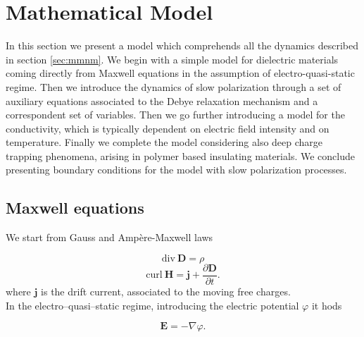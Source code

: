 \documentclass[11pt,a4paper]{article}
\begin{document}
\section{Mathematical Model}\label{sec:mat-model}
In this section we present a model which comprehends all the dynamics described in section \ref{sec:mmnm}. We begin with a simple model for dielectric materials coming directly from Maxwell equations in the assumption of electro-quasi-static regime. Then we introduce the dynamics of slow polarization through a set of auxiliary equations associated to the Debye relaxation mechanism and a correspondent set of variables. Then we go further introducing a model for the conductivity, which is typically dependent on electric field intensity and on temperature. Finally we complete the model considering also deep charge trapping phenomena, arising in polymer based insulating materials. We conclude presenting boundary conditions for the model with slow polarization processes.
\subsection{Maxwell equations}
We start from Gauss and Ampère-Maxwell laws

\begin{equation}
	\mathrm{div}\  \mathbf{D}  = \rho 
	\label{eq:Maxwell1}
\end{equation}
\begin{equation}
	\mathrm{curl}\ \mathbf{H} = \mathbf{j} + \dfrac{\partial \mathbf{D}}{\partial t}.
	\label{eq:Maxwell2}
\end{equation}
where \(\mathbf{j}\) is the drift current, associated to the moving free charges.\\
In the electro--quasi--static regime, introducing the electric potential \(\varphi\) it hods

\begin{equation} 
	\mathbf{E} = - \nabla \varphi.
	\label{eq:Epotential}
\end{equation}
\end{document}
